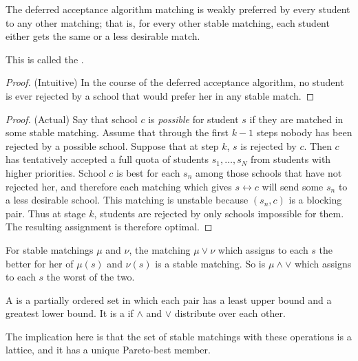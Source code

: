 \documentclass[10pt]{article}
\begin{document}
\begin{theorem}
	The deferred acceptance algorithm matching is weakly preferred by every student to any other matching; that is, for every other stable matching, each student either gets the same or a less desirable match.
\end{theorem}
\begin{remark}
	This is called the .
\end{remark}
\begin{proof}
	(Intuitive) In the course of the deferred acceptance algorithm, no student is ever rejected by a school that would prefer her in any stable match.
\end{proof}

\begin{proof}
	(Actual) Say that school $c$ is \emph{possible} for student $s$ if they are matched in some stable matching. Assume that through the first $k-1$ steps nobody has been rejected by a possible school. Suppose that at step $k$, $s$ is rejected by $c$. Then $c$ has tentatively accepted a full quota of students $s_1,\dots,s_N$ from students with higher priorities. School $c$ is best for each $s_n$ among those schools that have not rejected her, and therefore each matching which gives $s \longleftrightarrow c$ will send some $s_n$ to a less desirable school. This matching is unstable because $(s_n,c)$ is a blocking pair. Thus at stage $k$, students are rejected by only schools impossible for them. The resulting assignment is therefore optimal.
\end{proof}

\begin{theorem}
	For stable matchings $\mu$ and $\nu$, the matching $\mu \vee \nu$ which assigns to each $s$ the better for her of $\mu(s)$ and $\nu(s)$ is a stable matching. So is $\mu \wedge \vee$ which assigns to each $s$ the worst of the two.
\end{theorem}
\begin{definition}
	A  is a partially ordered set in which each pair has a least upper bound and a greatest lower bound. It is a  if $\wedge$ and $\vee$ distribute over each other. 
\end{definition}
\begin{remark}
	The implication here is that the set of stable matchings with these operations is a lattice, and it has a unique Pareto-best member.
\end{remark}
\end{document}
